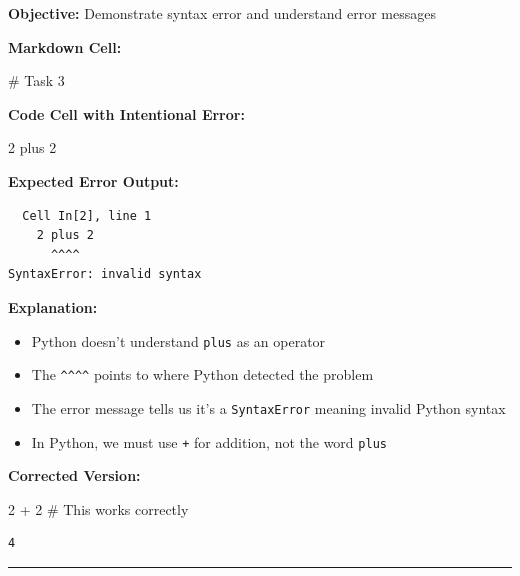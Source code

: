 \documentclass[
  11pt,
]{article}
\newenvironment{Shaded}{\begin{snugshade}}{\end{snugshade}}
\newcommand{\CommentTok}[1]{\textcolor[rgb]{0.37,0.37,0.37}{#1}}
\newcommand{\DecValTok}[1]{\textcolor[rgb]{0.68,0.00,0.00}{#1}}
\newcommand{\NormalTok}[1]{\textcolor[rgb]{0.00,0.23,0.31}{#1}}
\newcommand{\OperatorTok}[1]{\textcolor[rgb]{0.37,0.37,0.37}{#1}}
\begin{document}
\textbf{Objective:} Demonstrate syntax error and understand error
messages

\textbf{Markdown Cell:}

\begin{Shaded}
\begin{Highlighting}[]
\NormalTok{\# Task 3}
\end{Highlighting}
\end{Shaded}

\textbf{Code Cell with Intentional Error:}

\begin{Shaded}
\begin{Highlighting}[]
\DecValTok{2}\NormalTok{ plus }\DecValTok{2}
\end{Highlighting}
\end{Shaded}

\textbf{Expected Error Output:}

\begin{verbatim}
  Cell In[2], line 1
    2 plus 2
      ^^^^
SyntaxError: invalid syntax
\end{verbatim}

\textbf{Explanation:}

\begin{itemize}
\item
  Python doesn't understand \texttt{plus} as an operator
\item
  The \texttt{\^{}\^{}\^{}\^{}} points to where Python detected the
  problem
\item
  The error message tells us it's a \texttt{SyntaxError} meaning invalid
  Python syntax
\item
  In Python, we must use \texttt{+} for addition, not the word
  \texttt{plus}
\end{itemize}

\textbf{Corrected Version:}

\begin{Shaded}
\begin{Highlighting}[]
\DecValTok{2} \OperatorTok{+} \DecValTok{2}  \CommentTok{\# This works correctly}
\end{Highlighting}
\end{Shaded}

\begin{verbatim}
4
\end{verbatim}

\begin{center}\rule{0.5\linewidth}{0.5pt}\end{center}
\end{document}
